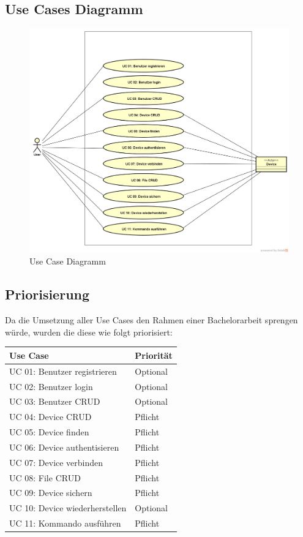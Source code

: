 \subsection{Use Cases Diagramm}
\begin{figure}[H]
\centering
\includegraphics[scale=0.39]{../02_Analyse/images/use_case_diagram.png}\caption{Use Case Diagramm}
\end{figure}
\newpage
\subsection{Priorisierung}
Da die Umsetzung aller Use Cases den Rahmen einer Bachelorarbeit sprengen würde, wurden die diese wie folgt priorisiert:
\begin{center}
\begin{longtable}{| p{5.5cm} | p{3cm} |}
\hline
\textbf{Use Case} & \textbf{Priorität}\\ \hline
UC 01: Benutzer registrieren     & Optional \\ \hline
UC 02: Benutzer login			 & Optional \\ \hline
UC 03: Benutzer CRUD	         & Optional \\ \hline 
UC 04: Device CRUD               & Pflicht \\ \hline 
UC 05: Device finden			 & Pflicht \\ \hline 
UC 06: Device authentisieren     & Pflicht \\ \hline
UC 07: Device verbinden			 & Pflicht \\ \hline
UC 08: File CRUD				 & Pflicht \\ \hline
UC 09: Device sichern			 & Pflicht \\ \hline
UC 10: Device wiederherstellen	 & Optional \\ \hline
UC 11: Kommando ausführen		 & Pflicht \\ \hline  
\end{longtable}
\end{center}
